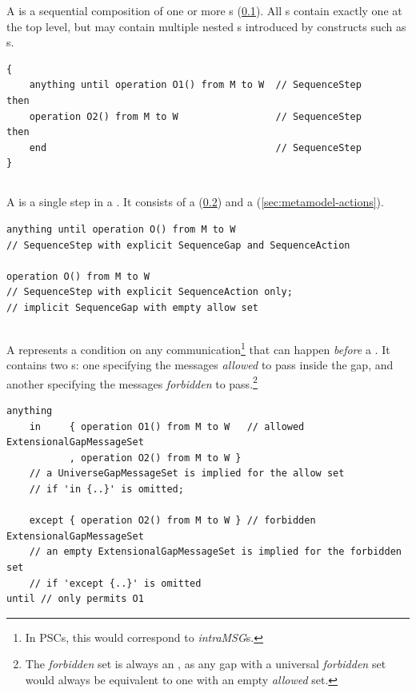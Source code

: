 A \msubsequence{} is a sequential composition of one or more \msequencestep s
(\cref{ssec:metamodel-sequences-steps}).
All \msequence s contain exactly one \msubsequence{} at the top level, but
may contain multiple nested \msubsequence s introduced by constructs such as
\mloopaction s.

\begin{lstlisting}[style=Example]
{
    anything until operation O1() from M to W  // SequenceStep
then
    operation O2() from M to W                 // SequenceStep
then
    end                                        // SequenceStep
}
\end{lstlisting}

\subsection{\msequencestep}\label{ssec:metamodel-sequences-steps}

A \msequencestep{} is a single step in a \msubsequence.  It consists of a
\msequencegap{} (\cref{ssec:metamodel-sequences-gaps}) and a
\msequenceaction{} (\cref{sec:metamodel-actions}).

\begin{lstlisting}[style=Example]
anything until operation O() from M to W
// SequenceStep with explicit SequenceGap and SequenceAction

operation O() from M to W
// SequenceStep with explicit SequenceAction only;
// implicit SequenceGap with empty allow set
\end{lstlisting}

\subsection{\msequencegap}\label{ssec:metamodel-sequences-gaps}

A \msequencegap{} represents a condition on any communication\footnote{In PSCs,
this would correspond to \emph{intraMSG}s.} that can happen
\emph{before} a \msequenceaction.  
It contains two \mgapmessageset s: one specifying the messages
\emph{allowed} to pass inside the gap, and another specifying the messages
\emph{forbidden} to pass.\footnote{The \emph{forbidden} set is always an
\mextensionalgapmessageset, as any gap with a universal
\emph{forbidden} set would always be equivalent to one with an empty
\emph{allowed} set.
}

\begin{lstlisting}[style=Example]
anything
    in     { operation O1() from M to W   // allowed ExtensionalGapMessageSet
           , operation O2() from M to W }
    // a UniverseGapMessageSet is implied for the allow set
    // if 'in {..}' is omitted;

    except { operation O2() from M to W } // forbidden ExtensionalGapMessageSet
    // an empty ExtensionalGapMessageSet is implied for the forbidden set
    // if 'except {..}' is omitted
until // only permits O1
\end{lstlisting}

